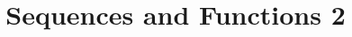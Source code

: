 \documentclass[a4paper]{article}
\title{Sequences and Functions 2}
\begin{document}
    \maketitle
    \pagebreak
    \tableofcontents
    \pagebreak

    
    
    
    
    
    
    
    
\end{document}
